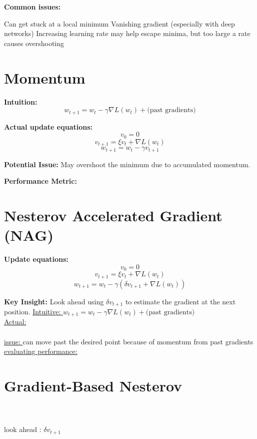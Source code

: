 \vspace{1em}
\textbf{Common issues:}
\begin{outline}
    \1 Can get stuck at a local minimum
    \1 Vanishing gradient (especially with deep networks)
    \1 Increasing learning rate may help escape minima, but too large a rate causes overshooting
\end{outline}

\section{Momentum}


\textbf{Intuition:}
\[
    w_{t+1} = w_t - \gamma \nabla L(w_t) + \text{(past gradients)}
\]

\textbf{Actual update equations:}
\[
    v_0 = 0
\]
\[
    v_{t+1} = \xi v_t + \nabla L(w_t)
\]
\[
    w_{t+1} = w_t - \gamma v_{t+1}
\]

\textbf{Potential Issue:} May overshoot the minimum due to accumulated momentum.

\textbf{Performance Metric:} 

\section{Nesterov Accelerated Gradient (NAG)}

\textbf{Update equations:}
\[
    v_0 = 0
\]
\[
    v_{t+1} = \xi v_t + \nabla L(w_t)
\]
\[
    w_{t+1} = w_t - \gamma (\delta v_{t+1} + \nabla L(w_t))
\]

\textbf{Key Insight:} Look ahead using $\delta v_{t+1}$ to estimate the gradient at the next position.
\underline{Intuitive: } $w_{t+1}=w_t-\gamma \nabla L(w_t) + \text{(past gradients)}$\\
\underline{Actual: }\\ 
\\
\underline{issue: } can move past the desired point because of momentum from past gradients\\
\underline{evaluating performance: } \\

\section{Gradient-Based Nesterov}
\\
\\
look ahead : $\delta v_{t+1}$
